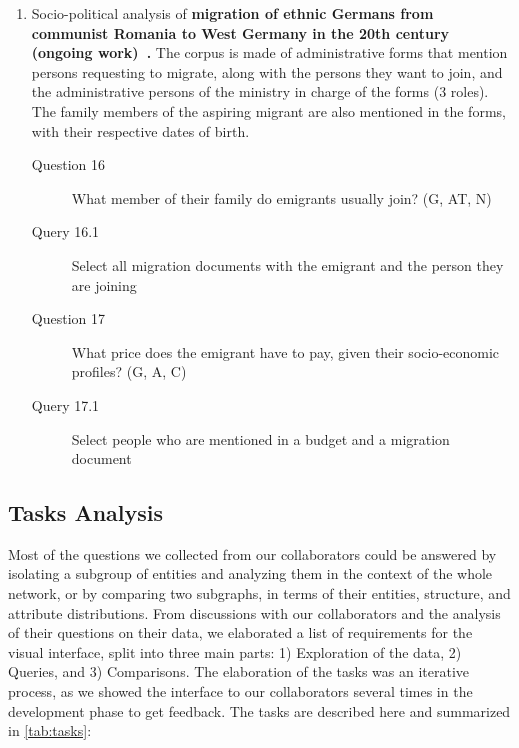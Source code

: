 \begin{enumerate}
    \item Socio-political analysis of \textbf{migration of ethnic Germans from communist Romania to West Germany in the 20th century (ongoing work)~\cite{diminescuMigrationEthnicGermans2020}.}
    The corpus is made of administrative forms that mention persons requesting to migrate, along with the persons they want to join, and the administrative persons of the ministry in charge of the forms (3 roles).
    The family members of the aspiring migrant are also mentioned in the forms, with their respective dates of birth.
     \begin{footnotesize}
    \begin{description}
    \item[Question 16] What member of their family do emigrants usually join? (G, AT, N)
    \item[\myindent Query 16.1] Select all migration documents with the emigrant and the person they are joining
    \item[Question 17] What price does the emigrant have to pay, given their socio-economic profiles? (G, A, C)
    \item[\myindent Query 17.1] Select people who are mentioned in a budget and a migration document
    \end{description}
    \end{footnotesize}
\end{enumerate}


\subsection{Tasks Analysis}

Most of the questions we collected from our collaborators could be answered by isolating a subgroup of entities and analyzing them in the context of the whole network, or by comparing two subgraphs, in terms of their entities, structure, and attribute distributions.
From discussions with our collaborators and the analysis of their questions on their data, we elaborated a list of requirements for the visual interface, split into three main parts: 1) Exploration of the data, 2) Queries, and 3) Comparisons.
The elaboration of the tasks was an iterative process, as we showed the interface to our collaborators several times in the development phase to get feedback.
The tasks are described here and summarized in \autoref{tab:tasks}:

